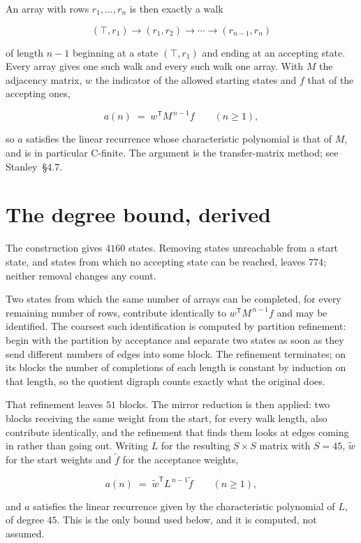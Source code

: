 \documentclass[11pt]{article}
\theoremstyle{definition}
\begin{document}
An array with rows $r_1,\dots,r_n$ is then exactly a walk

\[(\top,r_1) \to (r_1,r_2) \to \cdots \to (r_{n-1},r_n)\]

of length $n-1$ beginning at a state $(\top,r_1)$ and ending at an accepting state. Every array gives one such walk and every such walk one array. With $M$ the adjacency matrix, $w$ the indicator of the allowed starting states and $f$ that of the accepting ones,

\[a(n) \;=\; w^{\mathsf T} M^{\,n-1} f \qquad (n \ge 1),\]

so $a$ satisfies the linear recurrence whose characteristic polynomial is that of $M$, and is in particular C-finite. The argument is the transfer-matrix method; see Stanley~\S4.7.

\section{The degree bound, derived}

The construction gives $4160$ states. Removing states unreachable from a start state, and states from which no accepting state can be reached, leaves $774$; neither removal changes any count.

Two states from which the same number of arrays can be completed, for every remaining number of rows, contribute identically to $w^{\mathsf T}M^{\,n-1}f$ and may be identified. The coarsest such identification is computed by partition refinement: begin with the partition by acceptance and separate two states as soon as they send different numbers of edges into some block. The refinement terminates; on its blocks the number of completions of each length is constant by induction on that length, so the quotient digraph counts exactly what the original does.

That refinement leaves $51$ blocks. The mirror reduction is then applied: two blocks receiving the same weight from the start, for every walk length, also contribute identically, and the refinement that finds them looks at edges coming in rather than going out. Writing $L$ for the resulting $S \times S$ matrix with $S = 45$, $\tilde w$ for the start weights and $\tilde f$ for the acceptance weights,

\[a(n) \;=\; \tilde w^{\mathsf T} L^{\,n-1} \tilde f \qquad (n \ge 1),\]

and $a$ satisfies the linear recurrence given by the characteristic polynomial of $L$, of degree $45$. This is the only bound used below, and it is computed, not assumed.
\end{document}
